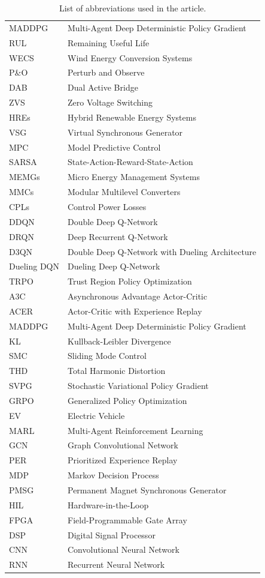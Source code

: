 \begin{table}[h]
\begin{tabular}{ll}
MADDPG & Multi-Agent Deep Deterministic Policy Gradient \\
RUL   & Remaining Useful Life \\
WECS  &Wind Energy Conversion Systems \\
P\&O & Perturb and Observe \\
DAB  & Dual Active Bridge \\
ZVS  & Zero Voltage Switching \\
HREs & Hybrid Renewable Energy Systems \\
VSG & Virtual Synchronous Generator \\
MPC & Model Predictive Control \\
SARSA & State-Action-Reward-State-Action \\
MEMGs & Micro Energy Management Systems \\
MMCs & Modular Multilevel Converters \\ 
CPLs & Control Power Losses \\
DDQN & Double Deep Q-Network \\
DRQN & Deep Recurrent Q-Network \\
D3QN & Double Deep Q-Network with Dueling Architecture \\
Dueling DQN & Dueling Deep Q-Network \\
TRPO & Trust Region Policy Optimization \\
A3C & Asynchronous Advantage Actor-Critic \\
ACER & Actor-Critic with Experience Replay \\
MADDPG & Multi-Agent Deep Deterministic Policy Gradient \\  
KL & Kullback-Leibler Divergence \\
SMC & Sliding Mode Control \\
THD & Total Harmonic Distortion \\
SVPG & Stochastic Variational Policy Gradient \\
GRPO & Generalized Policy Optimization \\
EV & Electric Vehicle \\
MARL & Multi-Agent Reinforcement Learning \\
GCN & Graph Convolutional Network \\
PER & Prioritized Experience Replay \\
MDP & Markov Decision Process \\
PMSG & Permanent Magnet Synchronous Generator \\
HIL & Hardware-in-the-Loop \\
FPGA & Field-Programmable Gate Array \\
DSP & Digital Signal Processor \\
CNN & Convolutional Neural Network \\
RNN & Recurrent Neural Network \\
\hline
\end{tabular}
\caption{List of abbreviations used in the article.}
\label{tab:abbreviations}
\end{table}


